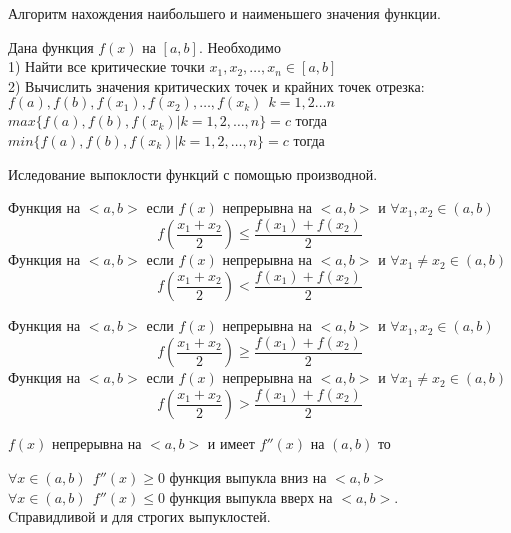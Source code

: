 \begin{title}[\Large]
  Алгоритм нахождения наибольшего и наименьшего значения функции.
\end{title}
Дана функция $f(x)$ на $[a,b]$. Необходимо\\
1) Найти все критические точки $x_1, x_2, \ldots, x_n \in [a, b]$\\
2) Вычислить значения критических точек и крайних точек отрезка:\\
$f(a), f(b), f(x_1), f(x_2), \ldots, f(x_k) ~~ k = 1, 2 \ldots n$\\
$max \{f(a), f(b), f(x_k) | k = 1, 2, \ldots, n\} = c $ тогда \\
$min \{f(a), f(b), f(x_k) | k = 1, 2, \ldots, n\} = c $ тогда 

\begin{title}[\Large]
  Иследование выпоклости функций с помощью производной.
\end{title}

\begin{defin}
  Функция  на $<a,b>$ если $f(x)$ непрерывна
  на $<a,b>$ и $\forall x_1, x_2 \in (a,b)$
  \[f(\frac{x_1 + x_2}{2}) \le \frac{f(x_1) + f(x_2)}{2}\]
  Функция  на $<a,b>$ если $f(x)$ непрерывна
  на $<a,b>$ и
  $\forall x_1 \not= x_2 \in (a,b)$
  \[f(\frac{x_1 + x_2}{2}) < \frac{f(x_1) + f(x_2)}{2}\]
\end{defin}

\begin{defin}
  Функция  на $<a,b>$ если $f(x)$ непрерывна
  на $<a,b>$ и $\forall x_1, x_2 \in (a,b)$
  \[f(\frac{x_1 + x_2}{2}) \ge \frac{f(x_1) + f(x_2)}{2}\]
  Функция  на $<a,b>$ если $f(x)$ непрерывна
  на $<a,b>$ и
  $\forall x_1 \not= x_2 \in (a,b)$
  \[f(\frac{x_1 + x_2}{2}) > \frac{f(x_1) + f(x_2)}{2}\]
\end{defin}

\begin{theorem}
  $f(x)$ непрерывна на $<a,b>$ и имеет $f''(x)$ на $(a,b)$ то

  $\forall x \in (a,b) ~~ f''(x) \ge 0$ функция выпукла вниз на $<a,b>$\\
  $\forall x \in (a,b) ~~ f''(x) \le 0$ функция выпукла вверх на $<a,b>$.\\
  Cправидливой и для строгих выпуклостей.
\end{theorem}

